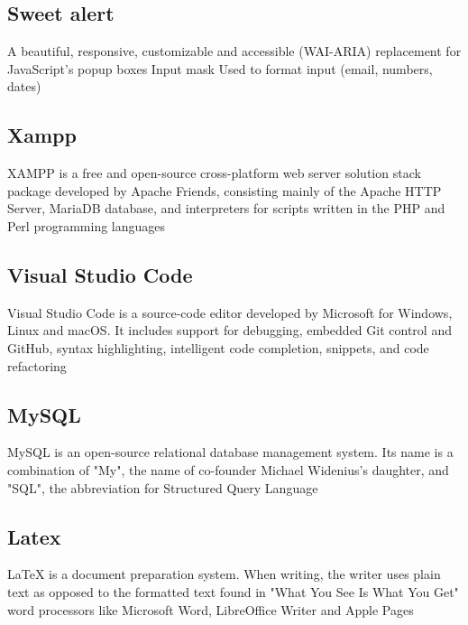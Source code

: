 \subsection{Sweet alert}
A beautiful, responsive, customizable and accessible (WAI-ARIA) replacement for JavaScript's popup boxes
Input mask
Used to format input (email, numbers, dates)
\subsection{Xampp}
XAMPP is a free and open-source cross-platform web server solution stack package developed by Apache Friends, consisting mainly of the Apache HTTP Server, MariaDB database, and interpreters for scripts written in the PHP and Perl programming languages
\subsection{Visual Studio Code}
Visual Studio Code is a source-code editor developed by Microsoft for Windows, Linux and macOS. It includes support for debugging, embedded Git control and GitHub, syntax highlighting, intelligent code completion, snippets, and code refactoring
\subsection{MySQL}
MySQL is an open-source relational database management system. Its name is a combination of "My", the name of co-founder Michael Widenius's daughter, and "SQL", the abbreviation for Structured Query Language
\subsection{Latex}
LaTeX is a document preparation system. When writing, the writer uses plain text as opposed to the formatted text found in "What You See Is What You Get" word processors like Microsoft Word, LibreOffice Writer and Apple Pages
